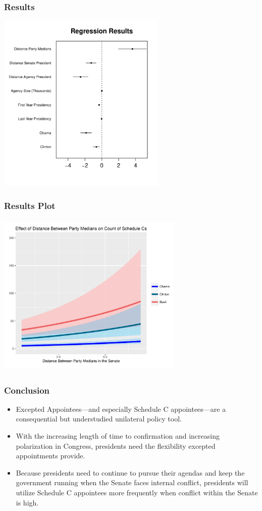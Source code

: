 \documentclass{beamer}
\begin{document}
\begin{frame}
\frametitle{Results}
\centering
\includegraphics[height=3.4in,width=3.2in]{CoefficientPlot.pdf}
\end{frame}

\begin{frame}
\frametitle{Results Plot}
\centering
\includegraphics[height=3.1in,width=3.5in]{ResultsPlots.pdf}
\end{frame}

\begin{frame}
\frametitle{Conclusion}
\large
\begin{itemize}\addtolength{\itemsep}{0.75\baselineskip}
\item Excepted Appointees---and especially Schedule C appointees---are a consequential but understudied unilateral policy tool.
\item With the increasing length of time to confirmation and increasing polarization in Congress, presidents need the flexibility excepted appointments provide.
\item Because presidents need to continue to pursue their agendas and keep the government running when the Senate faces internal conflict, presidents will utilize Schedule C appointees more frequently when conflict within the Senate is high. 
\end{itemize}
\end{frame}
\end{document}
